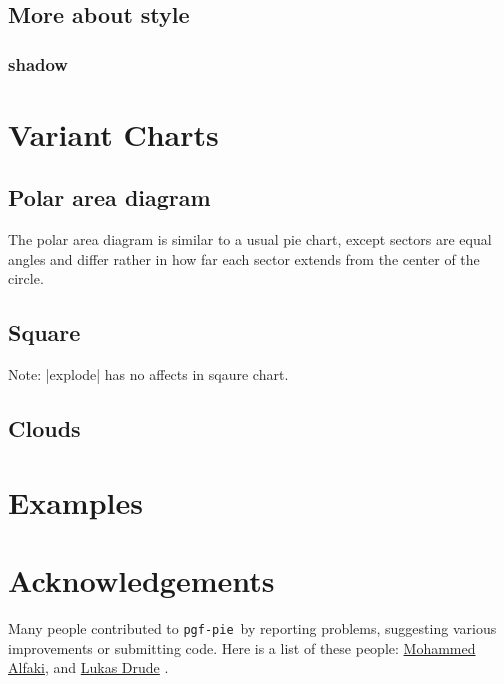 \documentclass{ltxdoc}
\newcommand\pgfpiename{\texttt{pgf-pie}}
\begin{document}
\codeexample[scale=0.25,from file={demo/text-inside.tex}]

\codeexample[scale=0.25,from file={demo/legend.tex}]

\subsection{More about style}
\subsubsection{shadow}
\codeexample[scale=0.25,from file={demo/shadow.tex}]

\section{Variant Charts}
\subsection{Polar area diagram}
The polar area diagram is similar to a usual pie chart, except sectors
are equal angles and differ rather in how far each sector extends from
the center of the circle.

\codeexample[scale=0.25,from file={demo/polar.tex}]

\subsection{Square}

\codeexample[scale=0.25,from file={demo/square.tex}]

Note: |explode| has no affects in sqaure chart.

\subsection{Clouds}

\codeexample[scale=0.25,from file={demo/cloud.tex}]

\section{Examples}


\section{Acknowledgements}
Many people contributed to \pgfpiename\ by reporting problems,
suggesting various improvements or submitting code. Here is a list of
these people:
\href{mailto:mohammed.alfaki@ii.uib.no}{Mohammed Alfaki},
and
\href{mailto:ldrude@mail.uni-paderborn.de}{Lukas Drude}
.
                                              
\end{document}
